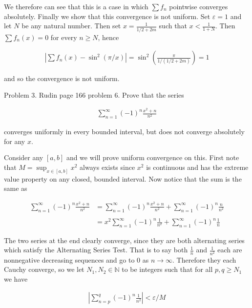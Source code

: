 \documentclass{article}
\begin{document}
  We therefore can see that this is a case in which $\sum f_n$ pointwise converges absolutely.  Finally we show that this convergence is not uniform. Set $\varepsilon=1$ and let $N$ be any natural number.  Then set $x=\frac{1}{1/2 + 2m}$ such that $x < \frac{1}{1+N}$.  Then $\sum f_n(x) = 0$ for every $n\geq N$, hence 

  \begin{align*}
    \left| \sum f_n(x)-\sin^2(\pi/x) \right| = \sin^2\left(\frac{\pi}{1/(1/2+2m)}\right) = 1
  \end{align*}

  and so the convergence is not uniform.  

  \pagebreak

  {\Large \color{Sepia} Problem 3. Rudin page 166 problem 6. Prove that the series 
  
    \begin{align*}
      \sum_{n=1}^\infty (-1)^n \frac{x^2+n}{n^2}
    \end{align*}

    converges uniformly in every bounded interval, but does not converge absolutely for any $x$.  
  
  }

  \vspace{1cm}

  Consider any $[a,b]$ and we will prove uniform convergence on this.  First note that $M=\sup_{x\in[a,b]}x^2$ always exists since $x^2$ is continuous and has the extreme value property on any closed, bounded interval.  Now notice that the sum is the same as 

  \begin{align*}
    \sum_{n=1}^\infty (-1)^n \frac{x^2+n}{n^2} &= 
    \sum_{n=1}^\infty (-1)^n \frac{x^2+n}{n^2} + 
    \sum_{n=1}^\infty (-1)^n \frac{n}{n^2} \\\\
    &= x^2\sum_{n=1}^\infty (-1)^n \frac{1}{n^2} +
    \sum_{n=1}^\infty (-1)^n \frac{1}{n}
  \end{align*}

  The two series at the end clearly converge, since they are both alternating series which satisfy the Alternating Series Test.  That is to say both $\frac{1}{n}$ and $\frac{1}{n^2}$ each are nonnegative decreasing sequences and go to 0 as $n\to \infty$. Therefore they each Cauchy converge, so we let $N_1,N_2\in \mathbb N$ to be integers such that for all $p,q\geq N_1$ we have 

  \begin{align*}
    \left|\sum_{n=p}^q (-1)^n \frac{1}{n^2} \right| < \varepsilon/M 
  \end{align*}
\end{document}
